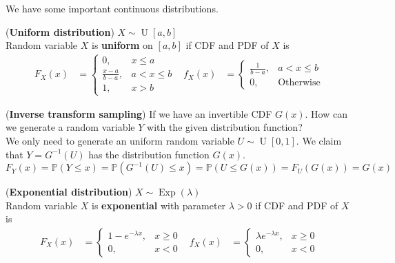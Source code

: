 \documentclass{huhtakm-template-book}
\newcommand{\prob}{\mathbb{P}}
\DeclareMathOperator{\U}{U}
\DeclareMathOperator{\Exp}{Exp}
\begin{document}
    We have some important continuous distributions.
    \begin{eg}(\textbf{Uniform distribution}) $X\sim\U[a,b]$\\
        Random variable $X$ is \textbf{uniform} on $[a,b]$ if CDF and PDF of $X$ is
        \begin{align*}
            F_{X}(x)&=\begin{cases}
                0, &x\leq a\\
                \frac{x-a}{b-a}, &a<x\leq b\\
                1, &x>b
            \end{cases} & f_{X}(x)&=\begin{cases}
                \frac{1}{b-a}, &a<x\leq b\\
                0, &\text{Otherwise}
            \end{cases}
        \end{align*}
    \end{eg}
    \begin{eg} (\textbf{Inverse transform sampling})
        If we have an invertible CDF $G(x)$. How can we generate a random variable $Y$ with the given distribution function?\\
        We only need to generate an uniform random variable $U\sim\U[0,1]$. We claim that $Y=G^{-1}(U)$ has the distribution function $G(x)$.
        \begin{equation*}
            F_{Y}(x)=\prob(Y\leq x)=\prob(G^{-1}(U)\leq x)=\prob(U\leq G(x))=F_{U}(G(x))=G(x)
        \end{equation*}
    \end{eg}
    \begin{eg}(\textbf{Exponential distribution}) $X\sim\Exp(\lambda)$\\
        Random variable $X$ is \textbf{exponential} with parameter $\lambda>0$ if CDF and PDF of $X$ is
        \begin{align*}
            F_{X}(x)&=\begin{cases}
                1-e^{-\lambda x}, &x\geq 0\\
                0, &x<0
            \end{cases} & f_{X}(x)&=\begin{cases}
                \lambda e^{-\lambda x}, &x\geq 0\\
                0, &x<0
            \end{cases}
        \end{align*}
    \end{eg}
\end{document}
